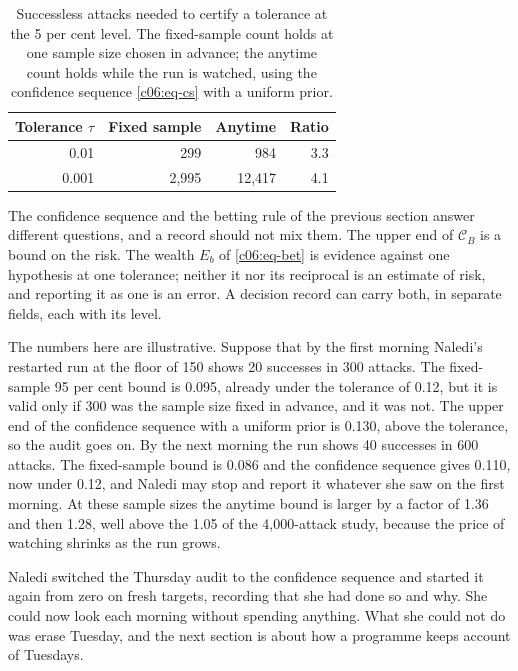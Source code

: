 \begin{table}[ht]
\centering
\caption{Successless attacks needed to certify a tolerance at the 5 per cent level.
The fixed-sample count holds at one sample size chosen in advance; the anytime
count holds while the run is watched, using the confidence sequence
\eqref{c06:eq-cs} with a uniform prior.}
\label{c06:tab-anytime}
\begin{tabular}{rrrr}
\toprule
Tolerance $\tau$ & Fixed sample & Anytime & Ratio \\
\midrule
0.01 & 299 & 984 & 3.3 \\
0.001 & 2{,}995 & 12{,}417 & 4.1 \\
\bottomrule
\end{tabular}
\end{table}

The confidence sequence and the betting rule of the previous section answer
different questions, and a record should not mix them. The upper end of
$\mathcal{C}_B$ is a bound on the risk. The wealth $E_b$ of \eqref{c06:eq-bet} is
evidence against one hypothesis at one tolerance; neither it nor its reciprocal is
an estimate of risk, and reporting it as one is an error. A decision record can
carry both, in separate fields, each with its level.

\begin{example}\label{c06:ex-restart}
The numbers here are illustrative. Suppose that by the first morning Naledi's restarted
run at the floor of 150 shows 20 successes in 300 attacks. The fixed-sample 95 per cent
bound is 0.095, already under the tolerance of 0.12, but it is valid only if 300 was the
sample size fixed in advance, and it was not. The upper end of the confidence sequence
with a uniform prior is 0.130, above the tolerance, so the audit goes on. By the next
morning the run shows 40 successes in 600 attacks. The fixed-sample bound is 0.086 and
the confidence sequence gives 0.110, now under 0.12, and Naledi may stop and report it
whatever she saw on the first morning. At these sample sizes the anytime bound is larger
by a factor of 1.36 and then 1.28, well above the 1.05 of the 4,000-attack study,
because the price of watching shrinks as the run grows.
\end{example}

Naledi switched the Thursday audit to the confidence sequence and started it again
from zero on fresh targets, recording that she had done so and why. She could now
look each morning without spending anything. What she could not do was erase
Tuesday, and the next section is about how a programme keeps account of Tuesdays.

